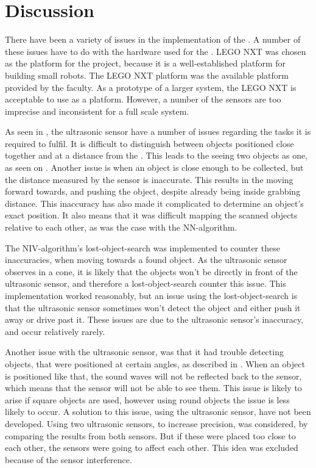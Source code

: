 \section{Discussion} \label{sec:discussion}

There have been a variety of issues in the implementation of the \projname{}. A number of these issues have to do with the hardware used for the \projname{}. LEGO NXT was chosen as the platform for the project, because it is a well-established platform for building small robots. The LEGO NXT platform was the available platform provided by the faculty. As a prototype of a larger system, the LEGO NXT is acceptable to use as a platform. However, a number of the sensors are too imprecise and inconsistent for a full scale system.

As seen in , the ultrasonic sensor have a number of issues regarding the tasks it is required to fulfil. It is difficult to distinguish between objects positioned close together and at a distance from the \projname{}. This leads to the \projname{} seeing two objects as one, as seen on . Another issue is when an object is close enough to be collected, but the distance measured by the sensor is inaccurate. This results in the \projname{} moving forward towards, and pushing the object, despite already being inside grabbing distance. This inaccuracy has also made it complicated to determine an object's exact position. It also means that it was difficult mapping the scanned objects relative to each other, as was the case with the NN-algorithm.

The NIV-algorithm's lost-object-search was implemented to counter these inaccuracies, when moving towards a found object. As the ultrasonic sensor observes in a cone, it is likely that the objects won't be directly in front of the ultrasonic sensor, and therefore a lost-object-search counter this issue. This implementation worked reasonably, but an issue using the lost-object-search is that the ultrasonic sensor sometimes won't detect the object and either push it away or drive past it. These issues are due to the ultrasonic sensor's inaccuracy, and occur relatively rarely.

Another issue with the ultrasonic sensor, was that it had trouble detecting objects, that were positioned at certain angles, as described in . When an object is positioned like that, the sound waves will not be reflected back to the sensor, which means that the sensor will not be able to see them. This issue is likely to arise if square objects are used, however using round objects the issue is less likely to occur. A solution to this issue, using the ultrasonic sensor, have not been developed. Using two ultrasonic sensors, to increase precision, was considered, by comparing the results from both sensors. But if these were placed too close to each other, the sensors were going to affect each other. This idea was excluded because of the sensor interference.

